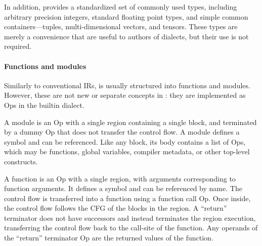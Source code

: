 In addition, \MLIR provides a standardized set of commonly used types,
including arbitrary precision integers, standard floating point types, and simple
common containers---tuples, multi-dimensional vectors, and tensors.  These types
are merely a convenience that are useful to authors of dialects, but their use is not
required.

\paragraph{Functions and modules}

Similarly to conventional IRs, \MLIR is usually structured into functions and
modules.  However, these are not new or separate concepts in \MLIR: they are
implemented as Ops in the builtin dialect.

A module is an Op with a single region containing a single block, and
terminated by a dummy Op that does not transfer the control flow. A module defines a
symbol and can be referenced. Like any block, its body contains a list of Ops,
which may be functions, global variables, compiler metadata, or other top-level
constructs.

A function is an Op with a single region, with arguments corresponding to
function arguments. It defines a symbol and can be referenced by name. The
control flow is transferred into a function using a function call Op. Once
inside, the control flow follows the CFG of the blocks in the region. A
``return'' terminator does not have successors and instead terminates the
region execution, transferring the control flow back to the call-site of the
function.
Any operands of the ``return'' terminator Op are the returned values of the
function.
